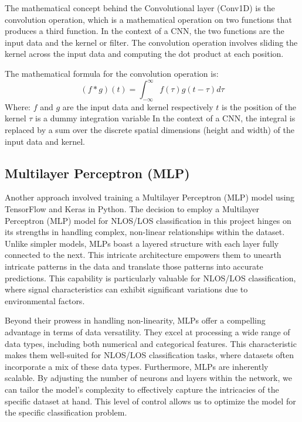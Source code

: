 \documentclass[
	article, %
	11pt, %
]{CSUniSchoolLabReport}
\begin{document}
The mathematical concept behind the Convolutional layer (Conv1D) is the convolution operation, which is a mathematical operation on two functions that produces a third function. In the context of a CNN, the two functions are the input data and the kernel or filter. The convolution operation involves sliding the kernel across the input data and computing the dot product at each position.

The mathematical formula for the convolution operation is:  $$ (f * g)(t) = \int_{-\infty}^{\infty} f(\tau)g(t - \tau) d\tau $$  Where:  
$f$ and $g$ are the input data and kernel respectively
$t$ is the position of the kernel
$\tau$ is a dummy integration variable
In the context of a CNN, the integral is replaced by a sum over the discrete spatial dimensions (height and width) of the input data and kernel.


\subsection{Multilayer Perceptron (MLP)}\label{mlp}                                                                                                         
Another approach involved training a Multilayer Perceptron (MLP) model using TensorFlow and Keras in Python. The decision to employ a Multilayer Perceptron (MLP) model for NLOS/LOS classification in this project hinges on its strengths in handling complex, non-linear relationships within the dataset. Unlike simpler models, MLPs boast a layered structure with each layer fully connected to the next. This intricate architecture empowers them to unearth intricate patterns in the data and translate those patterns into accurate predictions. This capability is particularly valuable for NLOS/LOS classification, where signal characteristics can exhibit significant variations due to environmental factors.

Beyond their prowess in handling non-linearity, MLPs offer a compelling advantage in terms of data versatility. They excel at processing a wide range of data types, including both numerical and categorical features. This characteristic makes them well-suited for NLOS/LOS classification tasks, where datasets often incorporate a mix of these data types. Furthermore, MLPs are inherently scalable. By adjusting the number of neurons and layers within the network, we can tailor the model's complexity to effectively capture the intricacies of the specific dataset at hand. This level of control allows us to optimize the model for the specific classification problem.
\end{document}
